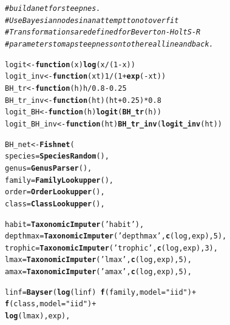 \documentclass{dragonfly-report}\usepackage[]{graphicx}\usepackage[]{color}
\makeatletter
\newcommand{\hlnum}[1]{\textcolor[rgb]{0.686,0.059,0.569}{#1}}%
\newcommand{\hlstr}[1]{\textcolor[rgb]{0.192,0.494,0.8}{#1}}%
\newcommand{\hlcom}[1]{\textcolor[rgb]{0.678,0.584,0.686}{\textit{#1}}}%
\newcommand{\hlopt}[1]{\textcolor[rgb]{0,0,0}{#1}}%
\newcommand{\hlstd}[1]{\textcolor[rgb]{0.345,0.345,0.345}{#1}}%
\newcommand{\hlkwa}[1]{\textcolor[rgb]{0.161,0.373,0.58}{\textbf{#1}}}%
\newcommand{\hlkwb}[1]{\textcolor[rgb]{0.69,0.353,0.396}{#1}}%
\newcommand{\hlkwc}[1]{\textcolor[rgb]{0.333,0.667,0.333}{#1}}%
\newcommand{\hlkwd}[1]{\textcolor[rgb]{0.737,0.353,0.396}{\textbf{#1}}}%
\newenvironment{kframe}{%
 \def\at@end@of@kframe{}%
 \ifinner\ifhmode%
  \def\at@end@of@kframe{\end{minipage}}%
  \begin{minipage}{\columnwidth}%
 \fi\fi%
 \def\FrameCommand##1{\hskip\@totalleftmargin \hskip-\fboxsep
 \colorbox{shadecolor}{##1}\hskip-\fboxsep
     \hskip-\linewidth \hskip-\@totalleftmargin \hskip\columnwidth}%
 \MakeFramed {\advance\hsize-\width
   \@totalleftmargin\z@ \linewidth\hsize
   \@setminipage}}%
 {\par\unskip\endMakeFramed%
 \at@end@of@kframe}
\newenvironment{knitrout}{}{} %
\makeatother
\begin{document}
\begin{knitrout}
\color{fgcolor}\begin{kframe}
\begin{alltt}
\hlcom{# build a net for steepnes. }
\hlcom{# Use Bayesian nodes in an attempt to not overfit}
\hlcom{# Transformations are defined for Beverton-Holt S-R }
\hlcom{# parameters to map steepness onto the real line and back.}

\hlstd{logit} \hlkwb{<-} \hlkwa{function}\hlstd{(}\hlkwc{x}\hlstd{)} \hlkwd{log}\hlstd{(x}\hlopt{/}\hlstd{(}\hlnum{1}\hlopt{-}\hlstd{x))}
\hlstd{logit_inv} \hlkwb{<-} \hlkwa{function}\hlstd{(}\hlkwc{xt}\hlstd{)} \hlnum{1}\hlopt{/}\hlstd{(}\hlnum{1} \hlopt{+} \hlkwd{exp}\hlstd{(}\hlopt{-}\hlstd{xt))}
\hlstd{BH_tr} \hlkwb{<-} \hlkwa{function}\hlstd{(}\hlkwc{h}\hlstd{) h}\hlopt{/}\hlnum{0.8}\hlopt{-}\hlnum{0.25}
\hlstd{BH_tr_inv} \hlkwb{<-} \hlkwa{function}\hlstd{(}\hlkwc{ht}\hlstd{) (ht}\hlopt{+}\hlnum{0.25}\hlstd{)}\hlopt{*}\hlnum{0.8}
\hlstd{logit_BH} \hlkwb{<-} \hlkwa{function}\hlstd{(}\hlkwc{h}\hlstd{)} \hlkwd{logit}\hlstd{(}\hlkwd{BH_tr}\hlstd{(h))}
\hlstd{logit_BH_inv} \hlkwb{<-} \hlkwa{function}\hlstd{(}\hlkwc{ht}\hlstd{)} \hlkwd{BH_tr_inv}\hlstd{(}\hlkwd{logit_inv}\hlstd{(ht))}

\hlstd{BH_net} \hlkwb{<-} \hlkwd{Fishnet}\hlstd{(}
  \hlkwc{species}   \hlstd{=} \hlkwd{SpeciesRandom}\hlstd{(),}
  \hlkwc{genus}     \hlstd{=} \hlkwd{GenusParser}\hlstd{(),}
  \hlkwc{family}    \hlstd{=} \hlkwd{FamilyLookupper}\hlstd{(),}
  \hlkwc{order}     \hlstd{=} \hlkwd{OrderLookupper}\hlstd{(),}
  \hlkwc{class}     \hlstd{=} \hlkwd{ClassLookupper}\hlstd{(),}

  \hlkwc{habit}     \hlstd{=} \hlkwd{TaxonomicImputer}\hlstd{(}\hlstr{'habit'}\hlstd{),}
  \hlkwc{depthmax}  \hlstd{=} \hlkwd{TaxonomicImputer}\hlstd{(}\hlstr{'depthmax'}\hlstd{,}\hlkwd{c}\hlstd{(log,exp),}\hlnum{5}\hlstd{),}
  \hlkwc{trophic}   \hlstd{=} \hlkwd{TaxonomicImputer}\hlstd{(}\hlstr{'trophic'}\hlstd{,}\hlkwd{c}\hlstd{(log,exp),}\hlnum{3}\hlstd{),}
  \hlkwc{lmax}      \hlstd{=} \hlkwd{TaxonomicImputer}\hlstd{(}\hlstr{'lmax'}\hlstd{,}\hlkwd{c}\hlstd{(log,exp),}\hlnum{5}\hlstd{),}
  \hlkwc{amax}      \hlstd{=} \hlkwd{TaxonomicImputer}\hlstd{(}\hlstr{'amax'}\hlstd{,}\hlkwd{c}\hlstd{(log,exp),}\hlnum{5}\hlstd{),}

  \hlkwc{linf}      \hlstd{=} \hlkwd{Bayser}\hlstd{(}\hlkwd{log}\hlstd{(linf)} \hlopt{~} \hlkwd{f}\hlstd{(family,}\hlkwc{model}\hlstd{=}\hlstr{"iid"}\hlstd{)} \hlopt{+}
                       \hlkwd{f}\hlstd{(class,}\hlkwc{model}\hlstd{=}\hlstr{"iid"}\hlstd{)} \hlopt{+}
                       \hlkwd{log}\hlstd{(lmax),exp),}


\end{alltt}
\end{kframe}
\end{knitrout}
\end{document}
